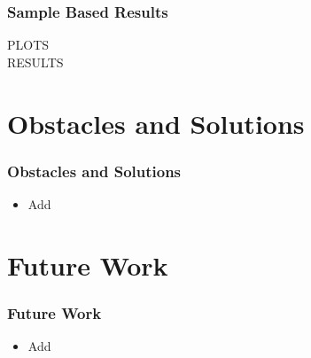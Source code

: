 \documentclass{beamer}
\begin{document}
\begin{frame}
\frametitle{Sample Based Results}
PLOTS\\
RESULTS
\end{frame}


\section{Obstacles and Solutions }
\begin{frame}
\frametitle{Obstacles and Solutions}
\begin{itemize}
\item Add
\end{itemize}
\end{frame}


\section{Future Work}
\begin{frame}
\frametitle{Future Work}
\begin{itemize}
\item Add
\end{itemize}
\end{frame}
\end{document}
